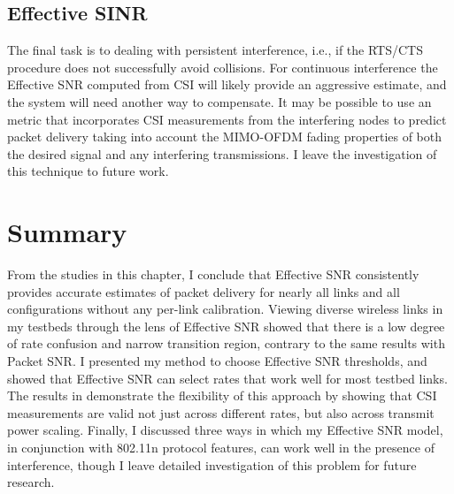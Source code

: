 \subsection{Effective SINR}
The final task is to dealing with persistent interference, i.e., if the RTS/CTS procedure does not successfully avoid collisions. For continuous interference the Effective SNR computed from CSI will likely provide an aggressive estimate, and the system will need another way to compensate. It may be possible to use an  metric that incorporates CSI measurements from the interfering nodes to predict packet delivery taking into account the MIMO-OFDM fading properties of both the desired signal and any interfering transmissions. I leave the investigation of this technique to future work.


\section{Summary}
From the studies in this chapter, I conclude that Effective SNR consistently provides accurate estimates of packet delivery for nearly all links and all configurations without any per-link calibration. Viewing diverse wireless links in my testbeds through the lens of Effective SNR showed that there is a low degree of rate confusion and narrow transition region, contrary to the same results with Packet SNR. I presented my method to choose Effective SNR thresholds, and showed that Effective SNR can select rates that work well for most testbed links. The results in  demonstrate the flexibility of this approach by showing that CSI measurements are valid not just across different rates, but also across transmit power scaling. Finally, I discussed three ways in which my Effective SNR model, in conjunction with 802.11n protocol features, can work well in the presence of interference, though I leave detailed investigation of this problem for future research.

